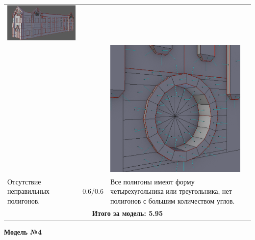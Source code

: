 \begin{longtable}{|p{4cm}|p{2.5cm}|p{7.5cm}|}
    \includegraphics[width=7cm]{src/norm_5}\\
    & & \includegraphics[width=7cm]{src/norm_6} \\
    \hline
    Отсутствие неправильных полигонов. & 0.6/0.6 & Все полигоны имеют форму четырехугольника или треугольника, нет полигонов с большим количеством углов. \\
    \hline
    \multicolumn{3}{|c|}{\textbf{Итого за модель: 5.95}}\\
    \hline
\end{longtable}

\begin{center}
    \textbf{Модель №4}
\end{center}

